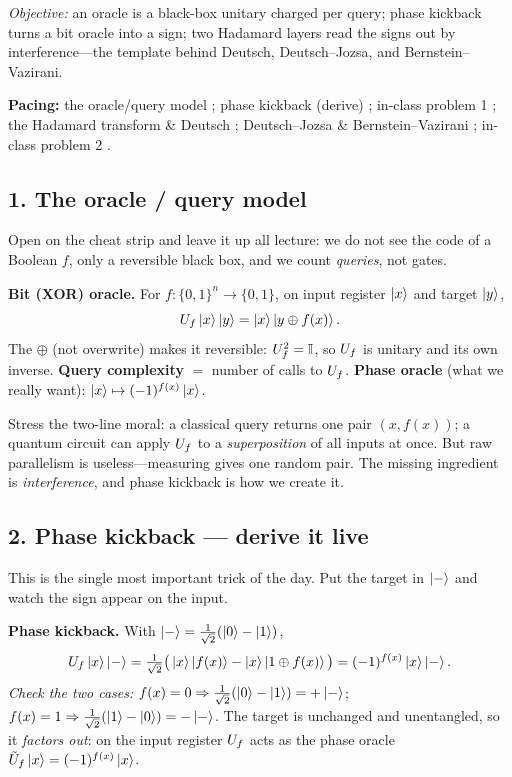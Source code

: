 \documentclass[11pt]{article}
\begin{document}
\noindent\emph{Objective:} an oracle is a black-box unitary charged per query;
phase kickback turns a bit oracle into a sign; two Hadamard layers read the signs
out by interference---the template behind Deutsch, Deutsch--Jozsa, and
Bernstein--Vazirani.

\medskip
\noindent\textbf{Pacing:} the oracle/query model ; phase kickback (derive)
; in-class problem 1 ; the Hadamard transform \& Deutsch
; Deutsch--Jozsa \& Bernstein--Vazirani ; in-class problem 2
.

\subsection*{1. The oracle / query model }
Open on the cheat strip and leave it up all lecture: we do not see the code of a
Boolean $f$, only a reversible black box, and we count \emph{queries}, not gates.

\begin{board}
\textbf{Bit (XOR) oracle.} For $f:\{0,1\}^n\to\{0,1\}$, on input register $\ket x$
and target $\ket y$,
\[
  U_f\ket{x}\ket{y}=\ket{x}\ket{y\oplus f(x)} .
\]
The $\oplus$ (not overwrite) makes it reversible: $U_f^2=\mathbb{I}$, so $U_f$ is unitary
and its own inverse. \textbf{Query complexity} $=$ number of calls to $U_f$.
\textbf{Phase oracle} (what we really want): $\ket{x}\mapsto(-1)^{f(x)}\ket{x}$.
\end{board}

Stress the two-line moral: a classical query returns one pair $(x,f(x))$; a
quantum circuit can apply $U_f$ to a \emph{superposition} of all inputs at once.
But raw parallelism is useless---measuring gives one random pair. The missing
ingredient is \emph{interference}, and phase kickback is how we create it.

\subsection*{2. Phase kickback --- derive it live }
This is the single most important trick of the day. Put the target in $\ket{-}$ and
watch the sign appear on the input.

\begin{board}
\textbf{Phase kickback.} With $\ket{-}=\tfrac1{\sqrt2}(\ket0-\ket1)$,
\[
  U_f\ket{x}\ket{-}
   =\tfrac1{\sqrt2}\big(\ket{x}\ket{f(x)}-\ket{x}\ket{1\oplus f(x)}\big)
   =(-1)^{f(x)}\ket{x}\ket{-}.
\]
\emph{Check the two cases:} $f(x)=0\Rightarrow\tfrac1{\sqrt2}(\ket0-\ket1)=+\ket{-}$;
$f(x)=1\Rightarrow\tfrac1{\sqrt2}(\ket1-\ket0)=-\ket{-}$. The target is unchanged
and unentangled, so it \emph{factors out}: on the input register $U_f$ acts as the
phase oracle $\tilde U_f\ket x=(-1)^{f(x)}\ket x$.
\end{board}
\end{document}
